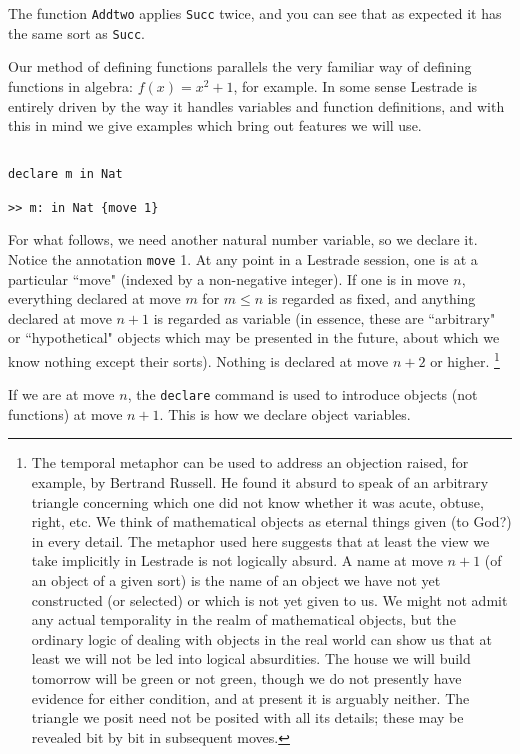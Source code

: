 \documentclass[12pt]{article}
\begin{document}
The function {\tt Addtwo} applies {\tt Succ} twice, and you can see that as expected it has the same sort as {\tt Succ}.

Our method of defining functions parallels the very familiar way of defining functions in algebra:  $f(x) = x^2+1$, for example.  In some sense Lestrade is entirely driven by the way it handles variables and function definitions, and with this in mind we give examples which bring out features we will use.

\begin{verbatim}

declare m in Nat

>> m: in Nat {move 1}

\end{verbatim}

For what follows, we need another natural number variable, so we declare it.  Notice the annotation {\tt move} 1.  At any point in a Lestrade session,
one is at a particular ``move" (indexed by a non-negative integer).  If one is in move $n$, everything declared at move $m$ for $m \leq n$ is regarded as fixed, and anything declared at move $n+1$ is regarded as variable (in essence, these are ``arbitrary" or ``hypothetical" objects which may be presented in the future, about which we know nothing except their sorts).  Nothing is declared at move $n+2$ or higher.  \footnote{The temporal metaphor can be used to address an objection raised, for example, by Bertrand Russell.  He found it absurd to speak of an arbitrary triangle concerning which one did not know whether it was acute, obtuse, right, etc.  We think of mathematical objects as eternal things given (to God?) in every detail.
The metaphor used here suggests that at least the view we take implicitly in Lestrade is not logically absurd.   A name at move $n+1$ (of an object of a given sort) is the name of an object we have not yet constructed (or selected) or which is not yet given to us.  We might not admit any actual temporality in the realm of mathematical objects, but the ordinary logic of dealing with objects in the real world can show us that at least we will not be led into logical absurdities.  The house we will build tomorrow will be green or not green, though we do not presently have evidence for either condition, and at present it is arguably neither.  The triangle we posit need not be posited with all its details;  these may be revealed bit by bit in subsequent moves.}

If we are at move $n$, the {\tt declare} command is used to introduce objects (not functions) at move $n+1$.  This is how we declare object variables.
\end{document}
